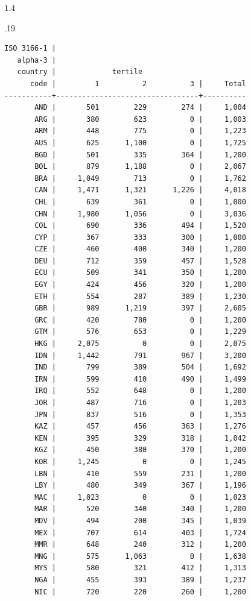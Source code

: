 \documentclass[10pt, letterpaper]{article}
\begin{document}
\begin{spacing}{1.4}
\begin{scriptsize}
\begin{spacing}{.19}
\begin{verbatim}
ISO 3166-1 |
   alpha-3 |
   country |             tertile
      code |         1          2          3 |     Total
-----------+---------------------------------+----------
       AND |       501        229        274 |     1,004 
       ARG |       380        623          0 |     1,003 
       ARM |       448        775          0 |     1,223 
       AUS |       625      1,100          0 |     1,725 
       BGD |       501        335        364 |     1,200 
       BOL |       879      1,188          0 |     2,067 
       BRA |     1,049        713          0 |     1,762 
       CAN |     1,471      1,321      1,226 |     4,018 
       CHL |       639        361          0 |     1,000 
       CHN |     1,980      1,056          0 |     3,036 
       COL |       690        336        494 |     1,520 
       CYP |       367        333        300 |     1,000 
       CZE |       460        400        340 |     1,200 
       DEU |       712        359        457 |     1,528 
       ECU |       509        341        350 |     1,200 
       EGY |       424        456        320 |     1,200 
       ETH |       554        287        389 |     1,230 
       GBR |       989      1,219        397 |     2,605 
       GRC |       420        780          0 |     1,200 
       GTM |       576        653          0 |     1,229 
       HKG |     2,075          0          0 |     2,075 
       IDN |     1,442        791        967 |     3,200 
       IND |       799        389        504 |     1,692 
       IRN |       599        410        490 |     1,499 
       IRQ |       552        648          0 |     1,200 
       JOR |       487        716          0 |     1,203 
       JPN |       837        516          0 |     1,353 
       KAZ |       457        456        363 |     1,276 
       KEN |       395        329        318 |     1,042 
       KGZ |       450        380        370 |     1,200 
       KOR |     1,245          0          0 |     1,245 
       LBN |       410        559        231 |     1,200 
       LBY |       480        349        367 |     1,196 
       MAC |     1,023          0          0 |     1,023 
       MAR |       520        340        340 |     1,200 
       MDV |       494        200        345 |     1,039 
       MEX |       707        614        403 |     1,724 
       MMR |       648        240        312 |     1,200 
       MNG |       575      1,063          0 |     1,638 
       MYS |       580        321        412 |     1,313 
       NGA |       455        393        389 |     1,237 
       NIC |       720        220        260 |     1,200 

\end{verbatim}
\end{spacing}
\end{scriptsize}
\end{spacing}
\end{document}
